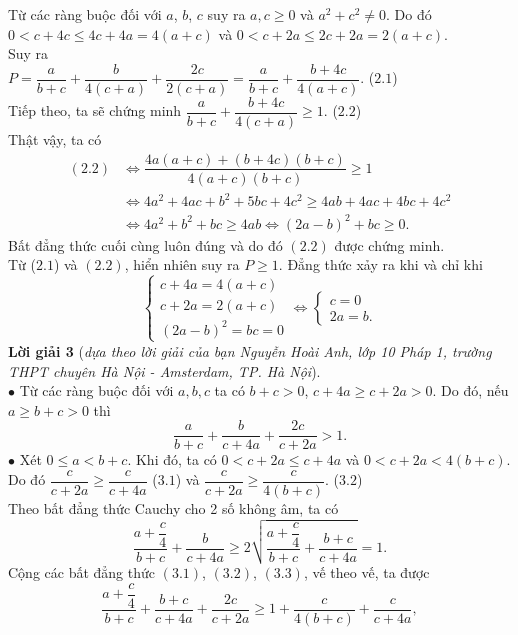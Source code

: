 \begin{bt}
{		Từ các ràng buộc đối với $a$, $b$, $c$ suy ra $a,c \ge 0$ và $a^2+c^2 \ne 0$. Do đó\\
		$0 < c+4c \le 4c + 4a  = 4(a+c)$ 
		và $0< c + 2a \le 2c + 2a = 2 (a+c)$.\\
		Suy ra \\
		$P = \dfrac{a}{b+c} + \dfrac{b}{4(c+a)} + \dfrac{2c}{2(c+a)} = \dfrac{a}{b+c} + \dfrac{b+4c}{4(a+c)}.$ \hfill ($2.1$)\\
		Tiếp theo, ta sẽ chứng minh $\dfrac{a}{b+c} + \dfrac{b+4c}{4(c+a)}\ge 1.$ \hfill ($2.2$)\\
		Thật vậy, ta có 
		\begin{align*}
		(2.2) & \Leftrightarrow \dfrac{4a(a+c) + (b+4c)(b+c)}{4(a+c)(b+c)} \ge 1\\
		& \Leftrightarrow 4a^2 + 4ac + b^2 + 5bc + 4c^2 \ge 4ab + 4ac + 4bc + 4c^2 \\
		& \Leftrightarrow 4a^2 + b^2 + bc \ge 4ab \Leftrightarrow (2a-b)^2 + bc \ge 0.
		\end{align*}
		Bất đẳng thức cuối cùng luôn đúng và do đó $(2.2)$ được chứng minh.\\
		Từ ($2.1$) và $(2.2)$, hiển nhiên suy ra $P \ge 1$. Đẳng thức xảy ra khi và chỉ khi 
		$$\begin{cases} c + 4a = 4(a+c) \\ c + 2a = 2(a+c) \\ (2a-b)^2 = bc = 0 \end{cases} \Leftrightarrow \begin{cases} c = 0 \\ 2a = b. \end{cases}$$
		{\bf Lời giải 3} (\textit{dựa theo lời giải của bạn Nguyễn Hoài Anh, lớp 10 Pháp 1, trường THPT chuyên Hà Nội - Amsterdam, TP. Hà Nội}).\\
		$\bullet$ Từ các ràng buộc đối với $a,b,c$ ta có $b+c > 0$, $c + 4a \ge c + 2a > 0$. Do đó, nếu $a \ge b + c >0$ thì 
		$$\dfrac{a}{b+c} + \dfrac{b}{c+4a} + \dfrac{2c}{c+2a}>1.$$
		$\bullet$ Xét $0 \le a < b+c$. Khi đó, ta có $0< c + 2a \le c + 4a$ và $0 < c+ 2a < 4(b+c)$.\\
		Do đó $\dfrac{c}{c+2a} \ge \dfrac{c}{c +4a}$ ($3.1$) và $\dfrac{c}{c+2a} \ge \dfrac{c}{4(b+c)}.$ ($3.2$)\\
		Theo bất đẳng thức Cauchy cho 2 số không âm, ta có 
		\[\dfrac{a+ \dfrac{c}{4}}{b+c} + \dfrac{b}{c+4a} \ge 2 \sqrt{\dfrac{a+\dfrac{c}{4}}{b+c}+ \dfrac{b+c}{c+4a}}=1.\tag{3.3}\]
		Cộng các bất đẳng thức $(3.1)$, $(3.2)$, $(3.3)$, vế theo vế, ta được
		$$ \dfrac{a+\dfrac{c}{4}}{b+c} + \dfrac{b+c}{c+4a} + \dfrac{2c}{c+2a} \ge 1 + \dfrac{c}{4(b+c)} + \dfrac{c}{c + 4a},$$
}
\end{bt}

